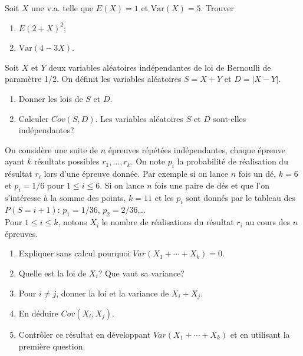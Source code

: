 \documentclass[a4paper,12pt,reqno]{amsart}
\begin{document}
\begin{exo}

  Soit $X$ une v.a. telle que $E(X)=1$ et $\text{Var}(X)=5$. Trouver

  \begin{enumerate}
    \item $E(2+X)^2$;
    \item $\text{Var}(4-3X)$.
  \end{enumerate}

\end{exo}

\begin{exo}

  Soit $X$ et $Y$ deux variables aléatoires indépendantes de loi de Bernoulli de paramètre 1/2. On définit les variables aléatoires $S=X+Y$ et $D=|X-Y|$.

  \begin{enumerate}
    \item Donner les lois de $S$ et $D$.
    \item Calculer $Cov(S,D)$. Les variables aléatoires $S$ et $D$ sont-elles indépendantes?
  \end{enumerate}

\end{exo}

\begin{exo}

  On considère une suite de $n$ épreuves répétées indépendantes, chaque épreuve ayant $k$ résultats possibles $r_1,\ldots,r_k$. On note $p_i$ la probabilité de réalisation du résultat $r_i$ lors d'une épreuve donnée. Par exemple si on lance $n$ fois un dé, $k=6$ et $p_i=1/6$ pour $1\leq i\leq 6$. Si on lance $n$ fois une paire de dés et que l'on s'intéresse à la somme des points, $k=11$ et les $p_i$ sont donnés par le tableau des $P(S=i+1)$: $p_1=1/36$, $p_2=2/36$,\dots \\
  Pour $1\leq i\leq k$, notons $X_i$ le nombre de réalisations du résultat $r_i$ au cours des $n$ épreuves.

  \begin{enumerate}
    \item Expliquer sans calcul pourquoi $Var(X_1+\cdots +X_k)=0$.
    \item Quelle est la loi de $X_i$? Que vaut sa variance?
    \item Pour $i\neq j$, donner la loi et la variance de $X_i+X_j$.
    \item En déduire $Cov(X_i,X_j)$.
    \item Contrôler ce résultat en développant $Var(X_1+\cdots +X_k)$ et en utilisant la première question.
  \end{enumerate}

\end{exo}
\end{document}
